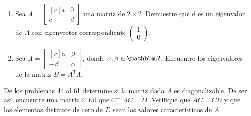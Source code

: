 \begin{enumerate}[resume]
    \item Sea $A=\begin{bmatrix*}[r]a & 0 \\ c & d\end{bmatrix*}$ una matriz de $2 \times 2$. Demuestre que $d$ es un eigenvalor de $A$ con eigenvector correspondiente $\begin{pmatrix*}1 \\ 0\end{pmatrix*}$.
    \item Sea $A=\begin{bmatrix*}[r]\alpha & \beta \\ -\beta & \alpha\end{bmatrix*}$, donde $\alpha, \beta \in \RR$. Encuentre los eigenvalores de la matriz $B=A^{T} A$.
\end{enumerate}
De los problemas 44 al 61 determine si la matriz dada $A$ es diagonalizable. De ser así, encuentre una matriz $C$ tal que $C^{-1} A C=D$. Verifique que $A C=C D$ y que los elementos distintos de cero de $D$ sean los valores característicos de $A$.
